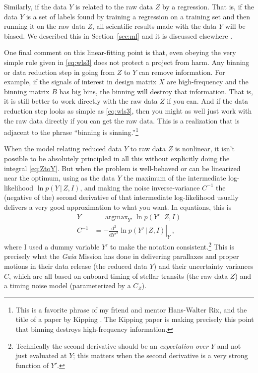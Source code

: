 \documentclass{article}
\newcommand{\sectionname}{Section}
\newcommand{\secref}[1]{\sectionname~\ref{#1}}
\newcommand{\dd}{\mathrm{d}}
\newcommand{\given}{\,|\,}
\DeclareMathOperator*{\argmax}{argmax}
\begin{document}
Similarly, if the data $Y$ is related to the raw data $Z$ by a regression.
That is, if the data $Y$ is a set of labels found by training a regression on a training set and then running it on the raw data $Z$, all scientific results made with the data $Y$ will be biased.
We described this in \secref{sec:ml} and it is discussed elsewhere \cite{goodorbad, ting}.

One final comment on this linear-fitting point is that, even obeying the very simple rule given in \eqref{eq:wls3} does not protect a project from harm.
Any binning or data reduction step in going from $Z$ to $Y$ can remove information.
For example, if the signals of interest in design matrix $X$ are high-frequency and the binning matrix $B$ has big bins, the binning will destroy that information.
That is, it is still better to work directly with the raw data $Z$ if you can.
And if the data reduction step looks as simple as \eqref{eq:wls3}, then you might as well just work with the raw data directly if you can get the raw data.
This is a realization that is adjacent to the phrase ``binning is sinning.''\footnote{This is a favorite phrase of my friend and mentor Hans-Walter Rix, and the title of a paper by Kipping \cite{binningissinning}. The Kipping paper is making precisely this point that binning destroys high-frequency information.}

When the model relating reduced data $Y$ to raw data $Z$ is nonlinear, it isn't possible to be absolutely principled in all this without explicitly doing the integral \eqref{eq:ZtoY}.
But when the problem is well-behaved or can be linearized near the optimum, using as the data $Y$ the maximum of the intermediate log-likelihood $\ln p(Y\given Z,I)$, and making the noise inverse-variance $C^{-1}$ the (negative of the) second derivative of that intermediate log-likelihood usually delivers a very good approximation to what you want.
In equations, this is
\begin{align}
    Y &= \argmax_{Y'} \ln p(Y'\given Z, I) \\
    C^{-1} &= - \left.\frac{\dd^2}{\dd {Y'}^2} \ln p(Y'\given Z, I)\right|_Y ~,
\end{align}
where I used a dummy variable $Y'$ to make the notation consistent.\footnote{Technically the second derivative should be an \emph{expectation over $Y$} and not just evaluated at $Y$; this matters when the second derivative is a very strong function of $Y'$.}
This is precisely what the \textsl{Gaia} Mission \cite{gaia} has done in delivering parallaxes and proper motions in their data release \cite{gaiadr3} (the reduced data $Y$) and their uncertainty variances $C$, which are all based on onboard timing of stellar transits (the raw data $Z$) and a timing noise model (parameterized by a $C_Z$).
\end{document}
